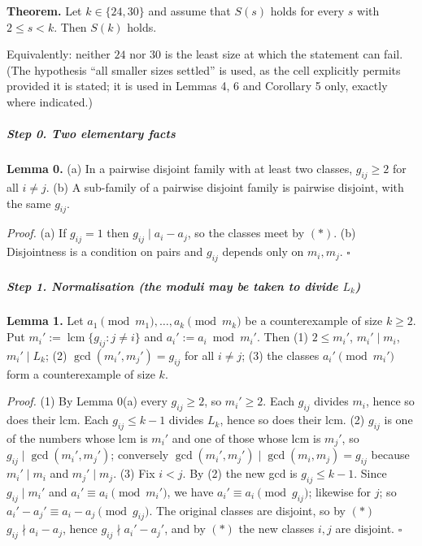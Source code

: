 \documentclass[11pt,a4paper]{article}
\begin{document}
\textbf{Theorem.} Let \(k\in\{24,30\}\) and assume that \(S(s)\) holds
for every \(s\) with \(2\le s<k\). Then \(S(k)\) holds.

Equivalently: neither \(24\) nor \(30\) is the least size at which the
statement can fail. (The hypothesis ``all smaller sizes settled'' is
used, as the cell explicitly permits provided it is stated; it is used
in Lemmas 4, 6 and Corollary 5 only, exactly where indicated.)

\subparagraph{Step 0. Two elementary
facts}\label{step-0.-two-elementary-facts}

\textbf{Lemma 0.} (a) In a pairwise disjoint family with at least two
classes, \(g_{ij}\ge2\) for all \(i\ne j\). (b) A sub-family of a
pairwise disjoint family is pairwise disjoint, with the same \(g_{ij}\).

\emph{Proof.} (a) If \(g_{ij}=1\) then \(g_{ij}\mid a_i-a_j\), so the
classes meet by \((*)\). (b) Disjointness is a condition on pairs and
\(g_{ij}\) depends only on \(m_i,m_j\). \(\square\)

\subparagraph{\texorpdfstring{Step 1. Normalisation (the moduli may be
taken to divide
\(L_k\))}{Step 1. Normalisation (the moduli may be taken to divide L\_k)}}\label{step-1.-normalisation-the-moduli-may-be-taken-to-divide-l_k}

\textbf{Lemma 1.} Let \(a_1\pmod{m_1},\dots,a_k\pmod{m_k}\) be a
counterexample of size \(k\ge2\). Put
\(m_i':=\operatorname{lcm}\{g_{ij}: j\ne i\}\) and
\(a_i':=a_i \bmod m_i'\). Then (1) \(2\le m_i'\), \(m_i'\mid m_i\),
\(m_i'\mid L_k\); (2) \(\gcd(m_i',m_j')=g_{ij}\) for all \(i\ne j\); (3)
the classes \(a_i'\pmod{m_i'}\) form a counterexample of size \(k\).

\emph{Proof.} (1) By Lemma 0(a) every \(g_{ij}\ge2\), so \(m_i'\ge2\).
Each \(g_{ij}\) divides \(m_i\), hence so does their lcm. Each
\(g_{ij}\le k-1\) divides \(L_k\), hence so does their lcm. (2)
\(g_{ij}\) is one of the numbers whose lcm is \(m_i'\) and one of those
whose lcm is \(m_j'\), so \(g_{ij}\mid\gcd(m_i',m_j')\); conversely
\(\gcd(m_i',m_j')\mid\gcd(m_i,m_j)=g_{ij}\) because \(m_i'\mid m_i\) and
\(m_j'\mid m_j\). (3) Fix \(i<j\). By (2) the new gcd is
\(g_{ij}\le k-1\). Since \(g_{ij}\mid m_i'\) and
\(a_i'\equiv a_i\pmod{m_i'}\), we have \(a_i'\equiv a_i\pmod{g_{ij}}\);
likewise for \(j\); so \(a_i'-a_j'\equiv a_i-a_j\pmod{g_{ij}}\). The
original classes are disjoint, so by \((*)\) \(g_{ij}\nmid a_i-a_j\),
hence \(g_{ij}\nmid a_i'-a_j'\), and by \((*)\) the new classes \(i,j\)
are disjoint. \(\square\)
\end{document}
